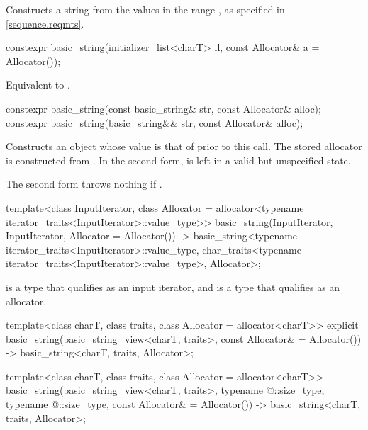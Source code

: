 \begin{itemdescr}
\pnum
\effects
Constructs a string from the values in the range ,
as specified in \ref{sequence.reqmts}.
\end{itemdescr}

%
\begin{itemdecl}
constexpr basic_string(initializer_list<charT> il, const Allocator& a = Allocator());
\end{itemdecl}

\begin{itemdescr}
\pnum
\effects
Equivalent to .
\end{itemdescr}

%
\begin{itemdecl}
constexpr basic_string(const basic_string& str, const Allocator& alloc);
constexpr basic_string(basic_string&& str, const Allocator& alloc);
\end{itemdecl}

\begin{itemdescr}
\pnum
\effects
Constructs an object whose value is
that of  prior to this call.
The stored allocator is constructed from .
In the second form,  is left in a valid but unspecified state.

\pnum
\throws
The second form throws nothing if .
\end{itemdescr}

\begin{itemdecl}
template<class InputIterator,
         class Allocator = allocator<typename iterator_traits<InputIterator>::value_type>>
  basic_string(InputIterator, InputIterator, Allocator = Allocator())
    -> basic_string<typename iterator_traits<InputIterator>::value_type,
                    char_traits<typename iterator_traits<InputIterator>::value_type>,
                    Allocator>;
\end{itemdecl}

\begin{itemdescr}
\pnum
\constraints
{} is a type that qualifies as an input iterator,
and  is a type that qualifies as an allocator.
\end{itemdescr}

\begin{itemdecl}
template<class charT,
         class traits,
         class Allocator = allocator<charT>>
  explicit basic_string(basic_string_view<charT, traits>, const Allocator& = Allocator())
    -> basic_string<charT, traits, Allocator>;

template<class charT,
         class traits,
         class Allocator = allocator<charT>>
  basic_string(basic_string_view<charT, traits>,
               typename @\seebelow@::size_type, typename @\seebelow@::size_type,
               const Allocator& = Allocator())
    -> basic_string<charT, traits, Allocator>;
\end{itemdecl}

